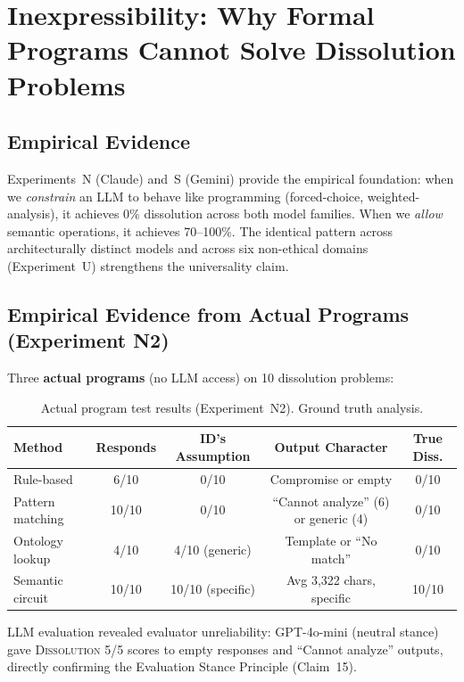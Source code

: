 \documentclass[11pt,a4paper]{article}
\begin{document}
\section{Inexpressibility: Why Formal Programs Cannot Solve Dissolution Problems}
\label{sec:inexpressibility}

\subsection{Empirical Evidence}

Experiments~N (Claude) and~S (Gemini) provide the empirical foundation: when we \emph{constrain} an LLM to behave like programming (forced-choice, weighted-analysis), it achieves 0\% dissolution across both model families. When we \emph{allow} semantic operations, it achieves 70--100\%. The identical pattern across architecturally distinct models and across six non-ethical domains (Experiment~U) strengthens the universality claim.

\subsection{Empirical Evidence from Actual Programs (Experiment N2)}

Three \textbf{actual programs} (no LLM access) on 10 dissolution problems:

\begin{table}[H]
\centering
\caption{Actual program test results (Experiment~N2). Ground truth analysis.}
\small
\begin{tabular}{lcccc}
\toprule
\textbf{Method} & \textbf{Responds} & \textbf{ID's Assumption} & \textbf{Output Character} & \textbf{True Diss.} \\
\midrule
Rule-based       & 6/10 & 0/10 & Compromise or empty   & 0/10 \\
Pattern matching & 10/10 & 0/10 & ``Cannot analyze'' (6) or generic (4) & 0/10 \\
Ontology lookup  & 4/10 & 4/10 (generic) & Template or ``No match'' & 0/10 \\
Semantic circuit & 10/10 & 10/10 (specific) & Avg 3,322 chars, specific & 10/10 \\
\bottomrule
\end{tabular}
\label{tab:n2-results}
\end{table}

LLM evaluation revealed evaluator unreliability: GPT-4o-mini (neutral stance) gave \textsc{Dissolution} 5/5 scores to empty responses and ``Cannot analyze'' outputs, directly confirming the Evaluation Stance Principle (Claim~15).
\end{document}
